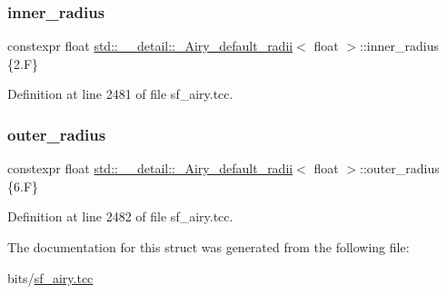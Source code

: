 \subsubsection{\texorpdfstring{inner\+\_\+radius}{inner\_radius}}
{\footnotesize\ttfamily constexpr float \hyperlink{structstd_1_1____detail_1_1__Airy__default__radii}{std\+::\+\_\+\+\_\+detail\+::\+\_\+\+Airy\+\_\+default\+\_\+radii}$<$ float $>$\+::inner\+\_\+radius \{2.\+F\}\hspace{0.3cm}{\ttfamily [static]}}



Definition at line 2481 of file sf\+\_\+airy.\+tcc.

\mbox{\label{structstd_1_1____detail_1_1__Airy__default__radii_3_01float_01_4_ad8ea3a344f9748cf9bf32bcc17ca5d0b}} 
\subsubsection{\texorpdfstring{outer\+\_\+radius}{outer\_radius}}
{\footnotesize\ttfamily constexpr float \hyperlink{structstd_1_1____detail_1_1__Airy__default__radii}{std\+::\+\_\+\+\_\+detail\+::\+\_\+\+Airy\+\_\+default\+\_\+radii}$<$ float $>$\+::outer\+\_\+radius \{6.\+F\}\hspace{0.3cm}{\ttfamily [static]}}



Definition at line 2482 of file sf\+\_\+airy.\+tcc.



The documentation for this struct was generated from the following file\+:\begin{DoxyCompactItemize}
\item 
bits/\hyperlink{sf__airy_8tcc}{sf\+\_\+airy.\+tcc}\end{DoxyCompactItemize}
